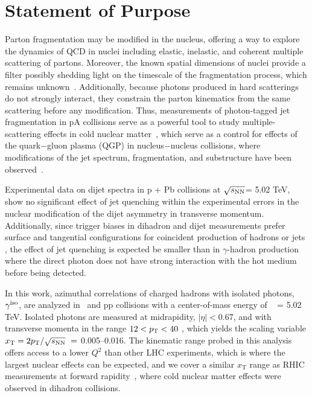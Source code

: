 \section{Statement of Purpose}

Parton fragmentation may be modified in the nucleus, offering a way to explore the dynamics of QCD in nuclei including elastic, inelastic, and coherent multiple scattering of partons. Moreover, the known spatial dimensions of nuclei provide a filter possibly shedding light on the timescale of the fragmentation process, which remains unknown~\cite{Accardi:2009qv,Accardi:2012qut}. Additionally, because photons produced in hard scatterings do not strongly interact, they constrain the parton kinematics from the same scattering before any modification. Thus, measurements of photon-tagged jet fragmentation in pA collisions serve as a powerful tool to study multiple-scattering effects in cold nuclear matter~\cite{Xing:2012ii}, which serve as a control for effects of the quark$-$gluon plasma (QGP) in nucleus$-$nucleus collisions, where modifications of the jet spectrum, fragmentation, and substructure have been observed~\cite{Connors:2017ptx}.

Experimental data \cite{Chatrchyan2014} on dijet spectra in p + Pb collisions at $\sqrt{s_\mathrm{NN}}$= 5.02 TeV, show no significant effect of jet quenching within the experimental errors in the nuclear modification of the dijet asymmetry in transverse momentum. Additionally, since trigger biases in dihadron and dijet measurements prefer surface and tangential configurations for coincident production of hadrons or jets \cite{Zhang2009}, the effect of jet quenching is expected be smaller than in $\gamma$-hadron production where the direct photon does not have strong interaction with the hot medium before being detected. 

In this work, azimuthal correlations of charged hadrons with isolated photons, $\gamma^\mathrm{iso}$, are analyzed in \pPb~and pp collisions with a center-of-mass energy of \sqrtsNN~ = 5.02 TeV. Isolated photons are measured at midrapidity, {$|\eta|<0.67$}, and with transverse momenta in the range $12 <p_{\mathrm{T}}<40$ \GeVc, which yields the scaling variable {$x_{\mathrm{T}} = 2\pt/\sqrt{s_{\mathrm{NN}}}\ = $ 0.005--0.016}. The kinematic range probed in this analysis offers access to a lower $Q^{2}$ than other LHC experiments, which is where the largest nuclear effects can be expected,  and we cover a similar $x_{\mathrm{T}}$ range as RHIC measurements at forward rapidity~\cite{Adare:2011sc}, where cold nuclear matter effects were observed in dihadron collisions. 

